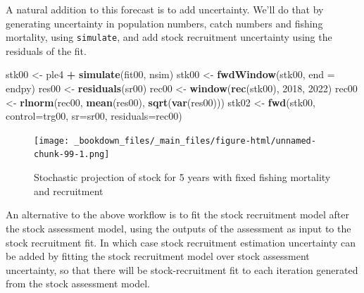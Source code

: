 \documentclass[
]{book}
\newenvironment{Shaded}{\begin{snugshade}}{\end{snugshade}}
\newcommand{\AttributeTok}[1]{\textcolor[rgb]{0.13,0.29,0.53}{#1}}
\newcommand{\DecValTok}[1]{\textcolor[rgb]{0.00,0.00,0.81}{#1}}
\newcommand{\FunctionTok}[1]{\textcolor[rgb]{0.13,0.29,0.53}{\textbf{#1}}}
\newcommand{\NormalTok}[1]{#1}
\newcommand{\OtherTok}[1]{\textcolor[rgb]{0.56,0.35,0.01}{#1}}
\newcommand{\SpecialCharTok}[1]{\textcolor[rgb]{0.81,0.36,0.00}{\textbf{#1}}}
\begin{document}
A natural addition to this forecast is to add uncertainty. We'll do that by generating uncertainty in population numbers, catch numbers and fishing mortality, using \texttt{simulate}, and add stock recruitment uncertainty using the residuals of the fit.

\begin{Shaded}
\begin{Highlighting}[]
\NormalTok{stk00 }\OtherTok{\textless{}{-}}\NormalTok{ ple4 }\SpecialCharTok{+} \FunctionTok{simulate}\NormalTok{(fit00, nsim)}
\NormalTok{stk00 }\OtherTok{\textless{}{-}} \FunctionTok{fwdWindow}\NormalTok{(stk00, }\AttributeTok{end =}\NormalTok{ endpy)}
\NormalTok{res00 }\OtherTok{\textless{}{-}} \FunctionTok{residuals}\NormalTok{(sr00)}
\NormalTok{rec00 }\OtherTok{\textless{}{-}} \FunctionTok{window}\NormalTok{(}\FunctionTok{rec}\NormalTok{(stk00), }\DecValTok{2018}\NormalTok{, }\DecValTok{2022}\NormalTok{)}
\NormalTok{rec00 }\OtherTok{\textless{}{-}} \FunctionTok{rlnorm}\NormalTok{(rec00, }\FunctionTok{mean}\NormalTok{(res00), }\FunctionTok{sqrt}\NormalTok{(}\FunctionTok{var}\NormalTok{(res00)))}
\NormalTok{stk02 }\OtherTok{\textless{}{-}} \FunctionTok{fwd}\NormalTok{(stk00, }\AttributeTok{control=}\NormalTok{trg00, }\AttributeTok{sr=}\NormalTok{sr00, }\AttributeTok{residuals=}\NormalTok{rec00)}
\end{Highlighting}
\end{Shaded}

\begin{figure}
\centering
\texttt{[image: \_bookdown\_files/\_main\_files/figure-html/unnamed-chunk-99-1.png]}
\caption{\label{fig:unnamed-chunk-99}Stochastic projection of stock for 5 years with fixed fishing mortality and recruitment}
\end{figure}

An alternative to the above workflow is to fit the stock recruitment model after the stock assessment model, using the outputs of the assessment as input to the stock recruitment fit. In which case stock recruitment estimation uncertainty can be added by fitting the stock recruitment model over stock assessment uncertainty, so that there will be stock-recruitment fit to each iteration generated from the stock assessment model.
\end{document}

